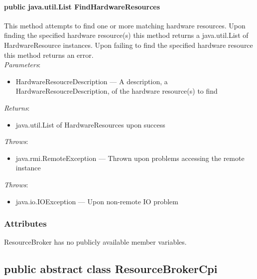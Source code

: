 \documentclass[$Date: 2003/06/26 19:29:31 $]{glabarticle}
\begin{document}
\paragraph{public java.util.List FindHardwareResources}

This method attempts to find one or more matching hardware
resources. Upon finding the specified hardware resource(s) this method
returns a java.util.List of HardwareResource instances. Upon failing to find the
specified hardware resource this method returns an error. \\

\textit{Parameters}:
\begin{itemize}
\item[] HardwareResoucreDescription --- A description, a  HardwareResoucreDescription, of the hardware
  resource(s) to find
\end{itemize}

\textit{Returns}:
\begin{itemize}
\item[] java.util.List of HardwareResources upon success
\end{itemize}

 \textit{Throws}:
 \begin{itemize}
 \item[] java.rmi.RemoteException --- Thrown upon problems accessing the remote instance 
 \end{itemize}
 
\textit{Throws}:
\begin{itemize}
\item[] java.io.IOException --- Upon non-remote IO problem 
\end{itemize}   


\subsubsection{Attributes}

ResourceBroker has no publicly available member variables.


\newpage

\subsection{public abstract class ResourceBrokerCpi}
\end{document}
